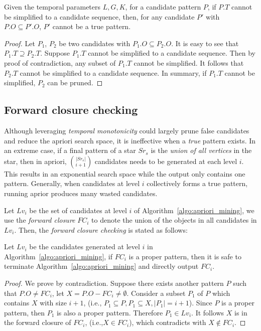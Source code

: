 \begin{theorem}
Given the temporal parameters $L,G,K$, for a candidate pattern $P$,
if $P.T$ cannot be simplified to a candidate sequence,
then, for any candidate $P'$ with $P.O \subseteq P'.O$, $P'$ cannot be a true pattern.
\end{theorem}
\begin{proof}
Let $P_1$, $P_2$ be two candidates with $P_1.O \subseteq P_2.O$. It is easy to see that $P_1.T \supseteq P_2.T$.
Suppose $P_1.T$ cannot be simplified to a candidate sequence. Then
by proof of contradiction, any subset of $P_1.T$ cannot
be simplified. It follows that $P_2.T$ cannot be simplified to a candidate sequence. 
In summary, if $P_1.T$ cannot be simplified, $P_2$ can be pruned. 
\end{proof}

\subsection{Forward closure checking}
Although leveraging \emph{temporal monotonicity} could largely prune
false candidates and reduce the apriori search space, 
it is ineffective when a \textit{true} pattern exists. 
In an extreme case, if a final pattern of a star $Sr_s$ is 
the \textit{union of all vertices} in the star,
then in apriori, ${|Sr_s|}\choose{i + 1}$ candidates needs to be generated at 
each level $i$. This results in an exponential search space while
the output only contains one pattern.  
Generally, when candidates at level $i$ collectively forms a true pattern, 
running aprior produces many wasted candidates. 

Let $Lv_i$ be the set of candidates at level $i$ of Algorithm~\ref{algo:apriori_mining},
we use the \emph{forward closure} $FC_i$ to denote the union of the objects in
all candidates in $Lv_i$. Then, the \emph{forward closure checking} is stated as follows:
\begin{theorem}
Let $Lv_i$ be the candidates generated at level $i$ in Algorithm~\ref{algo:apriori_mining},
if $FC_i$ is a proper pattern, then it is safe to terminate Algorithm~\ref{algo:apriori_mining}
and directly output $FC_i$.
\end{theorem}

\begin{proof}
We prove by contradiction. Suppose there exists another pattern $P$ such that $P.O \neq FC_i$, 
let $X=P.O - FC_i \neq \emptyset$. Consider a subset $P_1$ of $P$ which contains $X$ with size $i+1$, 
(i.e., $P_1 \subseteq P, P_1\subseteq X, |P_1|=i+1$). Since $P$ is a proper pattern, 
then $P_1$ is also a proper pattern. Therefore $P_1 \in Lv_i$.
It follows $X$ is in the forward closure of $FC_i$, (i.e.,$X \in FC_i$), which contradicts with $X\notin FC_i$.
\end{proof}

